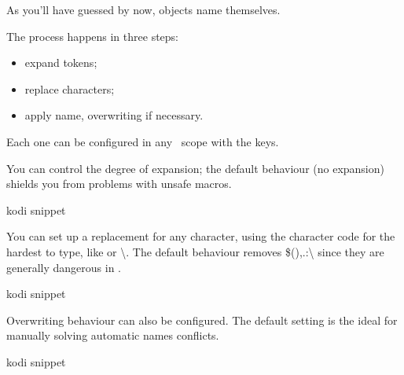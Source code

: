 As you'll have guessed by now, objects name themselves.

The process happens in three steps:
\begin{itemize}[nosep]
  \item expand tokens;
  \item replace characters;
  \item apply name, overwriting if necessary.
  \end{itemize}

Each one can be configured in any \koDi\ scope with the keys.

You can control the degree of expansion; the default behaviour (no expansion)
shields you from problems with unsafe macros.

\begin{tcblisting}{kodi snippet}
\end{tcblisting}

You can set up a replacement for any character, using the character code for
the hardest to type, like {\ttfamily \textvisiblespace} or {\ttfamily \textbackslash}.
The default behaviour removes {\ttfamily \$(),.:\textbackslash} since they
are generally dangerous in \TikZ.

\begin{tcblisting}{kodi snippet}
\end{tcblisting}

Overwriting behaviour can also be configured. The default setting is the ideal
for manually solving automatic names conflicts.

\begin{tcblisting}{kodi snippet}
\end{tcblisting}

